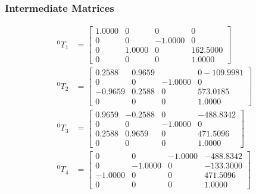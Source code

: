 \subsubsection{Intermediate Matrices}
\begin{equation*}
    \begin{split}
        ^{0}T_{1} & = \begin{bmatrix}
                          1.0000 & 0      & 0       & 0        \\
                          0      & 0      & -1.0000 & 0        \\
                          0      & 1.0000 & 0       & 162.5000 \\
                          0      & 0      & 0       & 1.0000
                      \end{bmatrix}     \\
        ^{0}T_{2} & = \begin{bmatrix}
                          0.2588  & 0.9659 &         & 0 -109.9981 \\
                          0       & 0      & -1.0000 & 0           \\
                          -0.9659 & 0.2588 & 0       & 573.0185    \\
                          0       & 0      & 0       & 1.0000
                      \end{bmatrix} \\
        ^{0}T_{3} & = \begin{bmatrix}
                          0.9659 & -0.2588 & 0       & -488.8342 \\
                          0      & 0       & -1.0000 & 0         \\
                          0.2588 & 0.9659  & 0       & 471.5096  \\
                          0      & 0       & 0       & 1.0000
                      \end{bmatrix}   \\
        ^{0}T_{4} & = \begin{bmatrix}
                          0       & 0       & -1.0000 & -488.8342 \\
                          0       & -1.0000 & 0       & -133.3000 \\
                          -1.0000 & 0       & 0       & 471.5096  \\
                          0       & 0       & 0       & 1.0000
                      \end{bmatrix}  \\

\end{split}
\end{equation*}
